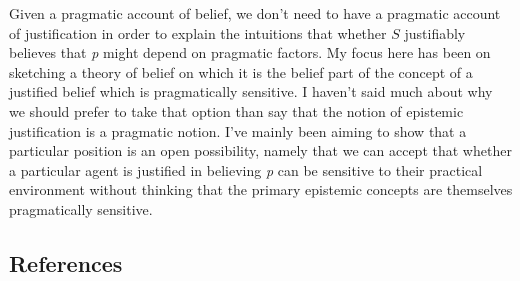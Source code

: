 \documentclass[
  11pt,
  letterpaper,
  DIV=11,
  numbers=noendperiod,
  oneside]{scrartcl}
\begin{document}
Given a pragmatic account of belief, we don't need to have a pragmatic
account of justification in order to explain the intuitions that whether
\(S\) justifiably believes that \emph{p} might depend on pragmatic
factors. My focus here has been on sketching a theory of belief on which
it is the belief part of the concept of a justified belief which is
pragmatically sensitive. I haven't said much about why we should prefer
to take that option than say that the notion of epistemic justification
is a pragmatic notion. I've mainly been aiming to show that a particular
position is an open possibility, namely that we can accept that whether
a particular agent is justified in believing \emph{p} can be sensitive
to their practical environment without thinking that the primary
epistemic concepts are themselves pragmatically sensitive.

\subsection*{References}\label{references}
\end{document}
